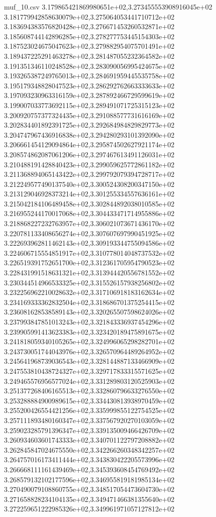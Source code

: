 \begin{filecontents*}{muf_10.csv}
3.179865421869980651e+02,3.273455553908916045e+02
3.181779942858630079e+02,3.275064053441710712e+02
3.183694383576820428e+02,3.276671453260532871e+02
3.185608744142896285e+02,3.278277753445154303e+02
3.187523024675047623e+02,3.279882954075701491e+02
3.189437225291463278e+02,3.281487055232364582e+02
3.191351346110248528e+02,3.283090056995424675e+02
3.193265387249765013e+02,3.284691959445535758e+02
3.195179348828047523e+02,3.286292762663333633e+02
3.197093230963316159e+02,3.287892466729599619e+02
3.199007033773692115e+02,3.289491071725315123e+02
3.200920757377324435e+02,3.291088577731616169e+02
3.202834401892391725e+02,3.292684984829829773e+02
3.204747967436916838e+02,3.294280293101392090e+02
3.206661454129094864e+02,3.295874502627921174e+02
3.208574862087061206e+02,3.297467613491126031e+02
3.210488191428840423e+02,3.299059625772861182e+02
3.211368894065143422e+02,3.299792079394728717e+02
3.212249577490137540e+02,3.300524308200347150e+02
3.213129046928373214e+02,3.301255334557636161e+02
3.215042184106489458e+02,3.302844892038010585e+02
3.216955244170017068e+02,3.304433471714955886e+02
3.218868227232763957e+02,3.306021073671436170e+02
3.220781133408656274e+02,3.307607697990451925e+02
3.222693962811462143e+02,3.309193344755094586e+02
3.224606715554851917e+02,3.310778014048737532e+02
3.226519391752651700e+02,3.312361705954790523e+02
3.228431991518631321e+02,3.313944420556781552e+02
3.230344514966533325e+02,3.315526157938256802e+02
3.232256962210028632e+02,3.317106918183162634e+02
3.234169333362832504e+02,3.318686701375254415e+02
3.236081628538589143e+02,3.320265507598624026e+02
3.237993847851013243e+02,3.321843336937454296e+02
3.239905991413623383e+02,3.323420189475891675e+02
3.241818059340105265e+02,3.324996065298282701e+02
3.243730051744043976e+02,3.326570964489264952e+02
3.245641968739036543e+02,3.328144887133466909e+02
3.247553810438724327e+02,3.329717833315571625e+02
3.249465576956577024e+02,3.331289803120525903e+02
3.251377268406165513e+02,3.332860796633276550e+02
3.253288884900989615e+02,3.334430813938970459e+02
3.255200426554421256e+02,3.335999855122754525e+02
3.257111893480160347e+02,3.337567920270103059e+02
3.259023285791396347e+02,3.339135009466426709e+02
3.260934603601743333e+02,3.340701122797208882e+02
3.262845847024675550e+02,3.342266260348342257e+02
3.264757016173411444e+02,3.343830422205573996e+02
3.266668111161439469e+02,3.345393608454769492e+02
3.268579132102177596e+02,3.346955819181985134e+02
3.270490079108860755e+02,3.348517054473604730e+02
3.271658828234104135e+02,3.349471466381355640e+02
3.272259651222985326e+02,3.349961971057127812e+02

\end{filecontents*}
